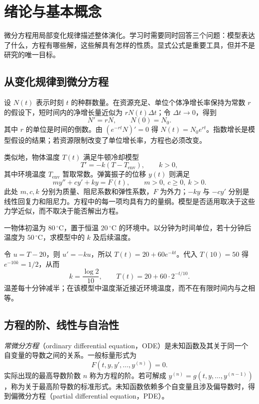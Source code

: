 \setcounter{chapter}{0} %
\chapter{绪论与基本概念}
\label{chap:ode-intro}

微分方程用局部变化规律描述整体演化。学习时需要同时回答三个问题：模型表达了什么，方程有哪些解，这些解具有怎样的性质。显式公式是重要工具，但并不是研究的唯一目标。

\section{从变化规律到微分方程}
设 $N(t)$ 表示时刻 $t$ 的种群数量。在资源充足、单位个体净增长率保持为常数 $r$ 的假设下，短时间内的净增长量近似为 $rN(t)\Delta t$；令 $\Delta t\to0$，得到
\[
  N'=rN,\qquad N(0)=N_0.
\]
其中 $r$ 的单位是时间的倒数。由 $(e^{-rt}N)'=0$ 得 $N(t)=N_0e^{rt}$。指数增长是模型假设的结果；若资源限制改变了单位增长率，方程也必须改变。

类似地，物体温度 $T(t)$ 满足牛顿冷却模型
\[
 T'=-k(T-T_{\mathrm{env}}),\qquad k>0,
\]
其中环境温度 $T_{\mathrm{env}}$ 暂取常数。弹簧振子的位移 $y(t)$ 则满足
\[
 my''+cy'+ky=F(t),\qquad m>0,\ c\geq0,\ k>0.
\]
此处 $m,c,k$ 分别为质量、阻尼系数和弹性系数，$F$ 为外力；$-ky$ 与 $-cy'$ 分别是线性回复力和阻尼力。方程中的每一项均具有力的量纲。模型是否适用取决于这些力学近似，而不取决于能否解出方程。

\begin{example}[冷却模型]
一物体初温为 $80\,{}^\circ\mathrm C$，置于恒温 $20\,{}^\circ\mathrm C$ 的环境中。以分钟为时间单位，若十分钟后温度为 $50\,{}^\circ\mathrm C$，求模型中的 $k$ 及后续温度。
\end{example}
\begin{solve}
令 $u=T-20$，则 $u'=-ku$，所以 $T(t)=20+60e^{-kt}$。代入 $T(10)=50$ 得 $e^{-10k}=1/2$，从而
\[
 k=\frac{\log2}{10},\qquad T(t)=20+60\cdot2^{-t/10}.
\]
温差每十分钟减半；在该模型中温度渐近接近环境温度，而不在有限时间内与之相等。
\end{solve}

\section{方程的阶、线性与自治性}
\begin{definition}
\emph{常微分方程}（ordinary differential equation，ODE）是未知函数及其关于同一个自变量的导数之间的关系。一般标量形式为
\[
 F(t,y,y',\ldots,y^{(n)})=0.
\]
实际出现的最高导数阶数 $n$ 称为方程的阶。若可解成 $y^{(n)}=g(t,y,\ldots,y^{(n-1)})$，称为关于最高阶导数的标准形式。未知函数依赖多个自变量且涉及偏导数时，得到偏微分方程（partial differential equation，PDE）。
\end{definition}


